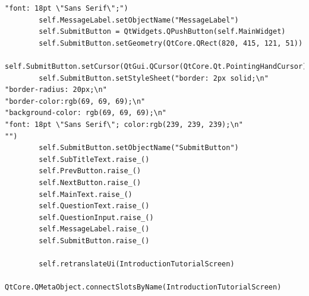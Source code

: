 \documentclass[12pt]{article}
\begin{document}
\begin{lstlisting}
"font: 18pt \"Sans Serif\";")
        self.MessageLabel.setObjectName("MessageLabel")
        self.SubmitButton = QtWidgets.QPushButton(self.MainWidget)
        self.SubmitButton.setGeometry(QtCore.QRect(820, 415, 121, 51))
        self.SubmitButton.setCursor(QtGui.QCursor(QtCore.Qt.PointingHandCursor))
        self.SubmitButton.setStyleSheet("border: 2px solid;\n"
"border-radius: 20px;\n"
"border-color:rgb(69, 69, 69);\n"
"background-color: rgb(69, 69, 69);\n"
"font: 18pt \"Sans Serif\"; color:rgb(239, 239, 239);\n"
"")
        self.SubmitButton.setObjectName("SubmitButton")
        self.SubTitleText.raise_()
        self.PrevButton.raise_()
        self.NextButton.raise_()
        self.MainText.raise_()
        self.QuestionText.raise_()
        self.QuestionInput.raise_()
        self.MessageLabel.raise_()
        self.SubmitButton.raise_()

        self.retranslateUi(IntroductionTutorialScreen)
        QtCore.QMetaObject.connectSlotsByName(IntroductionTutorialScreen)


\end{lstlisting}
\end{document}
